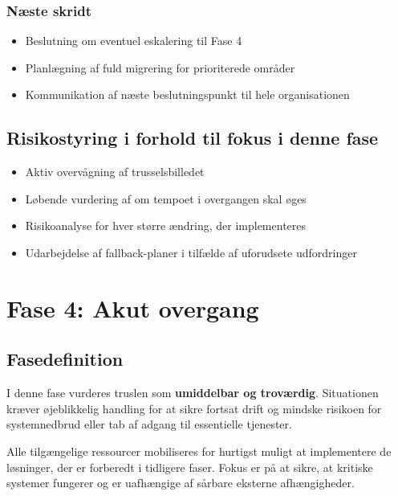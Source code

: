 \documentclass[a4paper,11pt]{book}
\begin{document}
\subsection{Næste skridt}\label{nuxe6ste-skridt}

\begin{itemize}
\tightlist
\item
  Beslutning om eventuel eskalering til Fase 4
\item
  Planlægning af fuld migrering for prioriterede områder
\item
  Kommunikation af næste beslutningspunkt til hele organisationen
\end{itemize}

\section{Risikostyring i forhold til fokus i denne
fase}\label{risikostyring-i-forhold-til-fokus-i-denne-fase}

\begin{itemize}
\tightlist
\item
  Aktiv overvågning af trusselsbilledet
\item
  Løbende vurdering af om tempoet i overgangen skal øges
\item
  Risikoanalyse for hver større ændring, der implementeres
\item
  Udarbejdelse af fallback-planer i tilfælde af uforudsete udfordringer
\end{itemize}

\newpage

\chapter{Fase 4: Akut overgang}\label{fase-4-akut-overgang}

\section{Fasedefinition}\label{fasedefinition}

I denne fase vurderes truslen som \textbf{umiddelbar og troværdig}.
Situationen kræver øjeblikkelig handling for at sikre fortsat drift og
mindske risikoen for systemnedbrud eller tab af adgang til essentielle
tjenester.

Alle tilgængelige ressourcer mobiliseres for hurtigst muligt at
implementere de løsninger, der er forberedt i tidligere faser. Fokus er
på at sikre, at kritiske systemer fungerer og er uafhængige af sårbare
eksterne afhængigheder.
\end{document}
